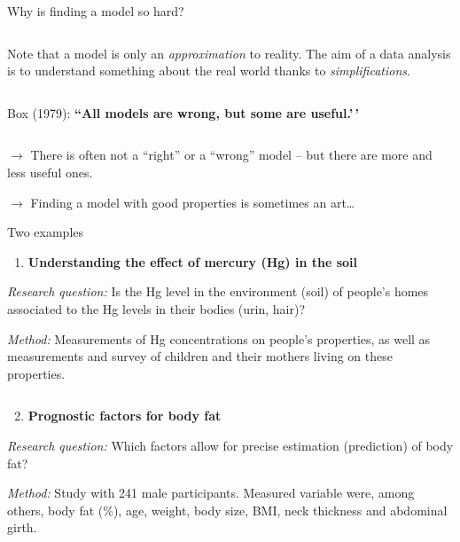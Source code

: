 \documentclass[
  10pt,
  ignorenonframetext,
]{beamer}
\providecommand{\tightlist}{%
  \setlength{\itemsep}{0pt}\setlength{\parskip}{0pt}}
\begin{document}
\begin{frame}
Why is finding a model so hard?

\(~\)

Note that a model is only an \emph{approximation} to reality. The aim of
a data analysis is to understand something about the real world thanks
to \emph{simplifications}.

\(~\)

Box (1979): \textbf{``All models are wrong, but some are useful.'\,'}

\(~\)

\(\rightarrow\) There is often not a ``right'' or a ``wrong'' model --
but there are more and less useful ones.

\(\rightarrow\) Finding a model with good properties is sometimes an
art\ldots{}
\end{frame}

\begin{frame}
\begin{block}{Two examples}
\protect\hypertarget{two-examples}{}
\(~\)

\begin{enumerate}
\tightlist
\item
  \textbf{Understanding the effect of mercury (Hg) in the soil}
\end{enumerate}

\vspace{1mm}

\emph{Research question:} Is the Hg level in the environment (soil) of
people's homes associated to the Hg levels in their bodies (urin, hair)?

\vspace{1mm}

\emph{Method:} Measurements of Hg concentrations on people's properties,
as well as measurements and survey of children and their mothers living
on these properties.

\(~\)

\begin{enumerate}
\setcounter{enumi}{1}
\tightlist
\item
  \textbf{Prognostic factors for body fat}
\end{enumerate}

\vspace{1mm}

\emph{Research question:} Which factors allow for precise estimation
(prediction) of body fat?

\vspace{1mm}

\emph{Method:} Study with 241 male participants. Measured variable were,
among others, body fat (\%), age, weight, body size, BMI, neck thickness
and abdominal girth.
\end{block}
\end{frame}
\end{document}
